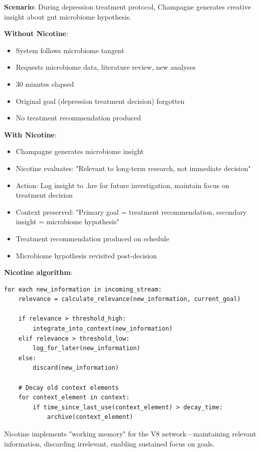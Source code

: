 \begin{example}
\textbf{Scenario}: During depression treatment protocol, Champagne generates creative insight about gut microbiome hypothesis.

\textbf{Without Nicotine}:
\begin{itemize}
\item System follows microbiome tangent
\item Requests microbiome data, literature review, new analyses
\item 30 minutes elapsed
\item Original goal (depression treatment decision) forgotten
\item No treatment recommendation produced
\end{itemize}

\textbf{With Nicotine}:
\begin{itemize}
\item Champagne generates microbiome insight
\item Nicotine evaluates: "Relevant to long-term research, not immediate decision"
\item Action: Log insight to .hre for future investigation, maintain focus on treatment decision
\item Context preserved: "Primary goal = treatment recommendation, secondary insight = microbiome hypothesis"
\item Treatment recommendation produced on schedule
\item Microbiome hypothesis revisited post-decision
\end{itemize}

\textbf{Nicotine algorithm}:
\begin{verbatim}
for each new_information in incoming_stream:
    relevance = calculate_relevance(new_information, current_goal)
    
    if relevance > threshold_high:
        integrate_into_context(new_information)
    elif relevance > threshold_low:
        log_for_later(new_information)
    else:
        discard(new_information)
    
    # Decay old context elements
    for context_element in context:
        if time_since_last_use(context_element) > decay_time:
            archive(context_element)
\end{verbatim}

Nicotine implements "working memory" for the V8 network—maintaining relevant information, discarding irrelevant, enabling sustained focus on goals.
\end{example}

